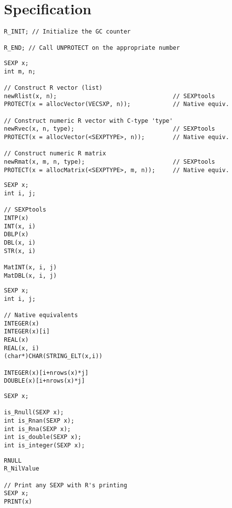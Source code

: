 \section{Specification}\label{specification}

\begin{lstlisting}[language=fanC,title=GC Counter]
R_INIT; // Initialize the GC counter

R_END; // Call UNPROTECT on the appropriate number
\end{lstlisting}


\begin{lstlisting}[language=fanC,title=Allocation]
SEXP x;
int m, n;

// Construct R vector (list)
newRlist(x, n);                                 // SEXPtools
PROTECT(x = allocVector(VECSXP, n));            // Native equiv.

// Construct numeric R vector with C-type 'type'
newRvec(x, n, type);                            // SEXPtools
PROTECT(x = allocVector(<SEXPTYPE>, n));        // Native equiv.

// Construct numeric R matrix
newRmat(x, m, n, type);                         // SEXPtools
PROTECT(x = allocMatrix(<SEXPTYPE>, m, n));     // Native equiv.
\end{lstlisting}


\begin{center}
\begin{minipage}{.485\textwidth}\centering
\begin{lstlisting}[language=fanC,title=Data Accessors]
SEXP x;
int i, j;

// SEXPtools
INTP(x)
INT(x, i)
DBLP(x)
DBL(x, i) 
STR(x, i)

MatINT(x, i, j)
MatDBL(x, i, j) 
\end{lstlisting}
\end{minipage}
\hspace{.2cm}
\begin{minipage}{.485\textwidth}\centering
\begin{lstlisting}[language=fanC,title=Data Accessors]
SEXP x;
int i, j;

// Native equivalents
INTEGER(x)
INTEGER(x)[i]
REAL(x)
REAL(x, i)
(char*)CHAR(STRING_ELT(x,i))

INTEGER(x)[i+nrows(x)*j]
DOUBLE(x)[i+nrows(x)*j]
\end{lstlisting}
\end{minipage}
\end{center}


\begin{lstlisting}[language=fanC,title=Testers]
SEXP x;

is_Rnull(SEXP x);
int is_Rnan(SEXP x);
int is_Rna(SEXP x);
int is_double(SEXP x);
int is_integer(SEXP x);
\end{lstlisting}


\begin{lstlisting}[language=fanC,title=Misc]
RNULL
R_NilValue

// Print any SEXP with R's printing
SEXP x;
PRINT(x)
\end{lstlisting}


